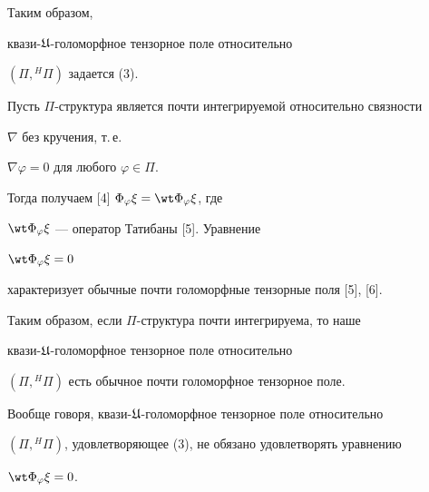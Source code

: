 Таким образом, 


квази-${\frak U}$-голоморфное тензорное поле относительно


$(\Pi, {}^H \Pi)$ задается (3).





Пусть $\Pi$-структура является почти интегрируемой относительно связности


$\nabla$ без кручения, т.\,е.\


$\nabla \varphi = 0$ для любого $\varphi \in \Pi$.


Тогда получаем [4] $\Phi_\varphi \xi = {\wt\Phi}_\varphi \xi$, где


${\wt\Phi}_\varphi \xi$ --- оператор Татибаны [5]. Уравнение 


${\wt\Phi}_\varphi \xi = 0$


характеризует обычные почти голоморфные тензорные поля [5], [6]. 


Таким образом, если $\Pi$-структура почти интегрируема, то наше 


квази-${\frak U}$-голоморфное тензорное поле относительно


$(\Pi, {}^H \Pi)$ есть обычное почти голоморфное тензорное поле.


Вообще говоря, квази-${\frak U}$-голоморфное тензорное поле относительно


$(\Pi, {}^H \Pi)$, удовлетворяющее (3), не обязано удовлетворять уравнению 


${\wt\Phi}_\varphi \xi = 0$.





